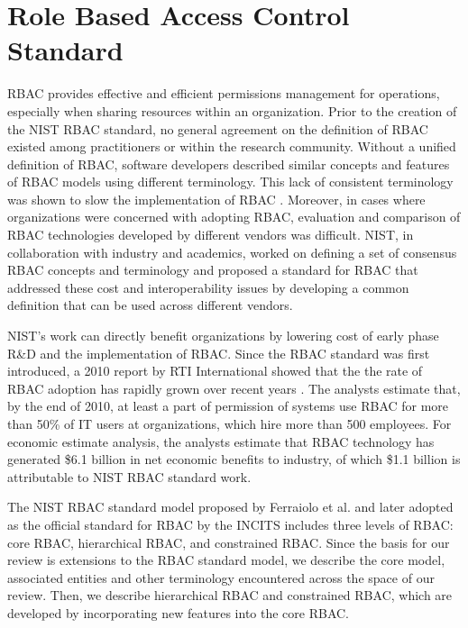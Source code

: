 \section{Role Based Access Control Standard} \label{sec:core-rbac}

RBAC provides effective and efficient permissions management for operations, especially when sharing resources within an organization.
Prior to the creation of the NIST RBAC standard, no general agreement on the definition 
of RBAC existed among practitioners or within the research community. 
Without a unified definition of RBAC, software developers described similar concepts and features of RBAC models using different terminology. 
This lack of consistent terminology was shown to slow the implementation of RBAC \cite{o20102010}.  
Moreover, in cases where organizations were concerned with adopting RBAC,
evaluation and comparison of RBAC technologies developed by different vendors was difficult.
NIST, in collaboration with industry and academics, worked on defining a set of consensus RBAC concepts and terminology and proposed a standard for 
RBAC that addressed these cost and interoperability issues by developing a common definition that can be used across different vendors.

NIST's work can directly benefit organizations by lowering cost of early phase R\&D and the implementation of RBAC.
Since the RBAC standard was first introduced, a 2010 report by RTI International showed that the the rate of RBAC adoption has rapidly grown over recent years \cite{o20102010}. 
The analysts estimate that, by the end of 2010, at least a part of permission of systems use RBAC for more than 50\% of IT users at organizations, which
hire more than 500 employees. For economic estimate analysis, the analysts estimate that RBAC technology has generated \$6.1 billion in net economic benefits to industry, of which \$1.1 billion is attributable to NIST RBAC standard work.

The NIST RBAC standard model proposed by Ferraiolo et al. \cite{ferraiolo} and later adopted as the official standard for RBAC by the INCITS includes three levels of RBAC: core RBAC, hierarchical RBAC, and constrained RBAC.
Since the basis for our review is extensions to the RBAC standard model, we describe the core model, associated entities and other terminology encountered across the space of our review. Then, we describe hierarchical RBAC and constrained RBAC, which are developed by incorporating new features into the core RBAC. 

